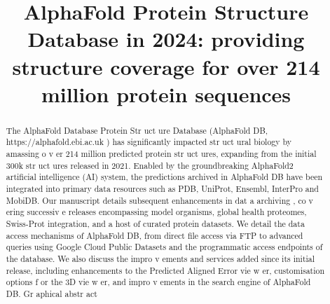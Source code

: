 \title{AlphaFold Protein Structure Database in 2024: providing structure coverage for over 214 million protein sequences}

\maketitle

\begin{abstract}
The AlphaFold Database Protein Str uct ure Database (AlphaFold DB, https://alphafold.ebi.ac.uk ) has significantly impacted str uct ural biology by amassing o v er 214 million predicted protein str uct ures, expanding from the initial 300k str uct ures released in 2021. Enabled by the groundbreaking AlphaFold2 artificial intelligence (AI) system, the predictions archived in AlphaFold DB have been integrated into primary data resources such as PDB, UniProt, Ensembl, InterPro and MobiDB. Our manuscript details subsequent enhancements in dat a archiving , co v ering successiv e releases encompassing model organisms, global health proteomes, Swiss-Prot integration, and a host of curated protein datasets. We detail the data access mechanisms of AlphaFold DB, from direct file access via FTP to advanced queries using Google Cloud Public Datasets and the programmatic access endpoints of the database. We also discuss the impro v ements and services added since its initial release, including enhancements to the Predicted Aligned Error vie w er, customisation options f or the 3D vie w er, and impro v ements in the search engine of AlphaFold DB. Gr aphical abstr act
\end{abstract}

